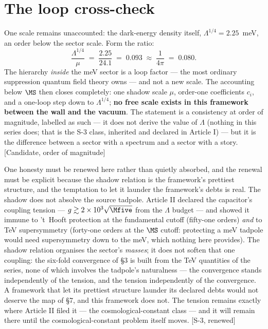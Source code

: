 \section{The loop cross-check}
One scale remains unaccounted: the dark-energy density itself, $\Lambda^{1/4}=2.25$~meV, an order below the sector scale. Form the ratio:
\begin{equation}
\frac{\Lambda^{1/4}}{\mu}\;=\;\frac{2.25}{24.1}\;=\;0.093\;\approx\;\frac{1}{4\pi}\;=\;0.080 .
\end{equation}
The hierarchy \emph{inside} the meV sector is a loop factor --- the most ordinary suppression quantum field theory owns --- and not a new scale. The accounting below $\MS$ then closes completely: one shadow scale $\mu$, order-one coefficients $c_{i}$, and a one-loop step down to $\Lambda^{1/4}$; \textbf{no free scale exists in this framework between the wall and the vacuum}. The statement is a consistency at order of magnitude, labelled as such --- it does not derive the value of $\Lambda$ (nothing in this series does; that is the S-3 class, inherited and declared in Article I) --- but it is the difference between a sector with a spectrum and a sector with a story. [Candidate, order of magnitude]

One honesty must be renewed here rather than quietly absorbed, and the renewal must be explicit because the shadow relation is the framework's prettiest structure, and the temptation to let it launder the framework's debts is real. The shadow does not absolve the source tadpole. Article II declared the capacitor's coupling tension --- $g\gtrsim2\times10^{3}\sqrt{\Mfive}$ from the $\Lambda$ budget --- and showed it immune to 't~Hooft protection at the fundamental cutoff (fifty-one orders) \emph{and} to TeV supersymmetry (forty-one orders at the $\MS$ cutoff: protecting a meV tadpole would need supersymmetry down to the meV, which nothing here provides). The shadow relation organises the sector's \emph{masses}; it does not soften that one coupling: the six-fold convergence of \S3 is built from the TeV quantities of the series, none of which involves the tadpole's naturalness --- the convergence stands independently of the tension, and the tension independently of the convergence. A framework that let its prettiest structure launder its declared debts would not deserve the map of \S7, and this framework does not. The tension remains exactly where Article II filed it --- the cosmological-constant class --- and it will remain there until the cosmological-constant problem itself moves. [S-3, renewed]

